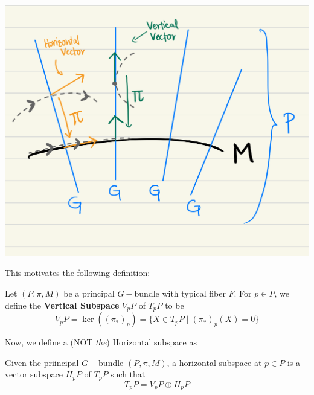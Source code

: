 \documentclass[11pt]{article}
\begin{document}
\begin{center}
    \includegraphics*[scale=0.15]{pictures/Hor-and-Ver-vectors.png}
\end{center}
This motivates the following definition:
\begin{definition}
    Let $(P, \pi, M)$ be a principal $G-$bundle with typical fiber $F$. For $p \in P$, we define the \textbf{Vertical Subspace} $V_{p} P$ of $T_{p} P$ to be \[ V_p P = \ker((\pi_*)_p) = \{ X \in T_p P \; | \; (\pi_*)_p (X) = 0 \} \]
\end{definition}

Now, we define a (NOT \emph{the}) Horizontal subspace as 
\begin{definition}
    Given the priincipal $G-$bundle $(P, \pi, M)$, a horizontal subspace at $p \in P$ is a vector subspace $H_p P$ of $T_p P$ such that \[ T_p P = V_p P \oplus H_p P \] 
\end{definition}
\end{document}
